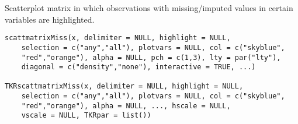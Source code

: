 %
\begin{Description}\relax
Scatterplot matrix in which observations with missing/imputed values in certain 
variables are highlighted.
\end{Description}
%
\begin{Usage}
\begin{verbatim}
scattmatrixMiss(x, delimiter = NULL, highlight = NULL, 
    selection = c("any","all"), plotvars = NULL, col = c("skyblue",
    "red","orange"), alpha = NULL, pch = c(1,3), lty = par("lty"),
    diagonal = c("density","none"), interactive = TRUE, ...)

TKRscattmatrixMiss(x, delimiter = NULL, highlight = NULL,
    selection = c("any","all"), plotvars = NULL, col = c("skyblue",
    "red","orange"), alpha = NULL, ..., hscale = NULL,
    vscale = NULL, TKRpar = list())
\end{verbatim}
\end{Usage}
%
